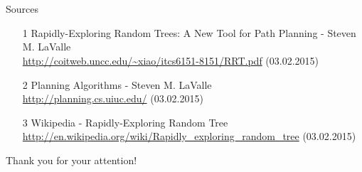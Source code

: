 \documentclass[%
  professionalfonts,%
  xcolor={%
    usenames,%
    dvipsnames,%
    svgnames,%
    table,%
    hyperref%
  }%
]{beamer}
\begin{document}
\section{}
\begin{frame}{Sources}
	\begin{itemize}
		\item[1] Rapidly-Exploring Random Trees: A New Tool for Path Planning - Steven M. LaValle
		\\\url{http://coitweb.uncc.edu/~xiao/itcs6151-8151/RRT.pdf} (03.02.2015)
		\item[2] Planning Algorithms - Steven M. LaValle
		\\\url{http://planning.cs.uiuc.edu/} (03.02.2015)
		\item[3] Wikipedia - Rapidly-Exploring Random Tree
		\\\url{http://en.wikipedia.org/wiki/Rapidly_exploring_random_tree} (03.02.2015)
	\end{itemize}
\end{frame}

\begin{frame}
	\centering\Huge{Thank you for your attention!}
\end{frame}
\end{document}
